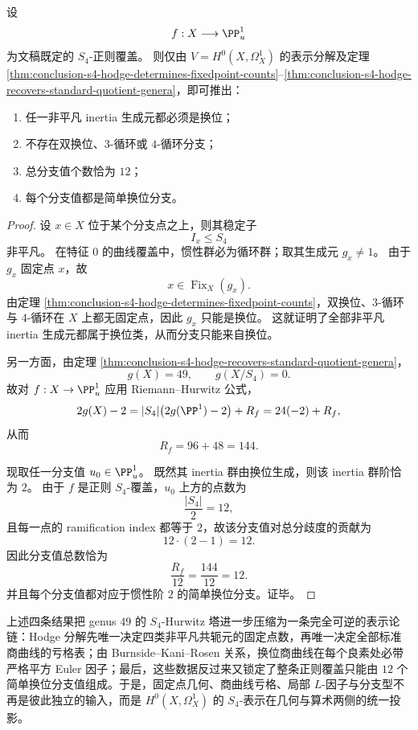 \begin{theorem}\label{thm:conclusion-s4-hodge-recovers-full-branch-type}
设
\[
f:X\longrightarrow \PP^1_u
\]
为文稿既定的 \(S_4\)-正则覆盖。
则仅由 \(V=H^0(X,\Omega_X^1)\) 的表示分解及定理 \ref{thm:conclusion-s4-hodge-determines-fixedpoint-counts}--\ref{thm:conclusion-s4-hodge-recovers-standard-quotient-genera}，即可推出：
\begin{enumerate}
  \item 任一非平凡 inertia 生成元都必须是换位；
  \item 不存在双换位、\(3\)-循环或 \(4\)-循环分支；
  \item 总分支值个数恰为 \(12\)；
  \item 每个分支值都是简单换位分支。
\end{enumerate}
\end{theorem}
\begin{proof}
设 \(x\in X\) 位于某个分支点之上，则其稳定子
\[
I_x\le S_4
\]
非平凡。
在特征 \(0\) 的曲线覆盖中，惯性群必为循环群；取其生成元 \(g_x\neq 1\)。
由于 \(g_x\) 固定点 \(x\)，故
\[
x\in \operatorname{Fix}_X(g_x).
\]
由定理 \ref{thm:conclusion-s4-hodge-determines-fixedpoint-counts}，双换位、\(3\)-循环与 \(4\)-循环在 \(X\) 上都无固定点，因此 \(g_x\) 只能是换位。
这就证明了全部非平凡 inertia 生成元都属于换位类，从而分支只能来自换位。

另一方面，由定理 \ref{thm:conclusion-s4-hodge-recovers-standard-quotient-genera}，
\[
g(X)=49,\qquad g(X/S_4)=0.
\]
故对 \(f:X\to \PP^1_u\) 应用 Riemann--Hurwitz 公式，
\[
2g(X)-2
=
|S_4|\bigl(2g(\PP^1)-2\bigr)+R_f
=
24(-2)+R_f,
\]
从而
\[
R_f=96+48=144.
\]

现取任一分支值 \(u_0\in \PP^1_u\)。
既然其 inertia 群由换位生成，则该 inertia 群阶恰为 \(2\)。
由于 \(f\) 是正则 \(S_4\)-覆盖，\(u_0\) 上方的点数为
\[
\frac{|S_4|}{2}=12,
\]
且每一点的 ramification index 都等于 \(2\)，故该分支值对总分歧度的贡献为
\[
12\cdot (2-1)=12.
\]
因此分支值总数恰为
\[
\frac{R_f}{12}=\frac{144}{12}=12.
\]
并且每个分支值都对应于惯性阶 \(2\) 的简单换位分支。证毕。
\end{proof}

上述四条结果把 genus \(49\) 的 \(S_4\)-Hurwitz 塔进一步压缩为一条完全可逆的表示论链：Hodge 分解先唯一决定四类非平凡共轭元的固定点数，再唯一决定全部标准商曲线的亏格表；由 Burnside--Kani--Rosen 关系，换位商曲线在每个良素处必带严格平方 Euler 因子；最后，这些数据反过来又锁定了整条正则覆盖只能由 \(12\) 个简单换位分支值组成。于是，固定点几何、商曲线亏格、局部 \(L\)-因子与分支型不再是彼此独立的输入，而是 \(H^0(X,\Omega_X^1)\) 的 \(S_4\)-表示在几何与算术两侧的统一投影。

\endinput
